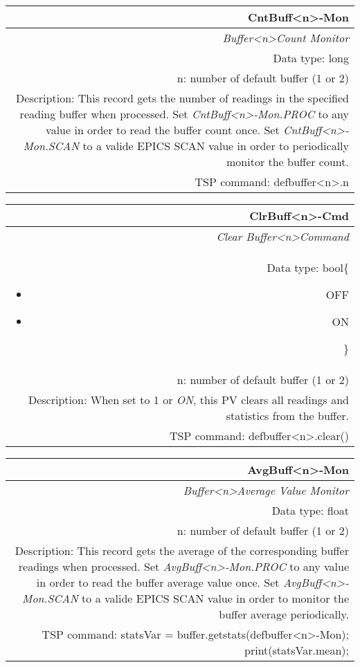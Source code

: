 \documentclass[openany]{article}
\begin{document}
		\begin{tabular}{N}
			\hline
			\bfseries CntBuff\textless n\textgreater-Mon\label{pv:cntbuff-mon} \\ \hline
			\emph{Buffer\textless n\textgreater Count Monitor} \\
			Data type: long \\
			n: number of default buffer (1 or 2) \\
			Description: This record gets the number of readings in the specified reading buffer when processed. Set \emph{CntBuff\textless n\textgreater-Mon.PROC} to any value in order to read the buffer count once. Set \emph{CntBuff\textless n\textgreater-Mon.SCAN} to a valide EPICS SCAN value in order to periodically monitor the buffer count. \\
			TSP command: defbuffer\textless n\textgreater.n
		\end{tabular}

		\begin{tabular}{N}
			\hline
			\bfseries ClrBuff\textless n\textgreater-Cmd\label{pv:clrbuff-cmd} \\ \hline
			\emph{Clear Buffer\textless n\textgreater Command} \\
			Data type: bool\{\begin{itemize}[noitemsep]
				\small
				\item[] OFF
				\item[] ON
			\end{itemize}\} \\
			n: number of default buffer (1 or 2) \\
			Description: When set to 1 or \emph{ON}, this PV clears all readings and statistics from the buffer. \\
			TSP command: defbuffer\textless n\textgreater.clear()
		\end{tabular}

		\begin{tabular}{N}
			\hline
			\bfseries AvgBuff\textless n\textgreater-Mon\label{pv:avgbuff-mon} \\ \hline
			\emph{Buffer\textless n\textgreater Average Value Monitor} \\
			Data type: float \\
			n: number of default buffer (1 or 2) \\
			Description: This record gets the average of the corresponding buffer readings when processed. Set \emph{AvgBuff\textless n\textgreater-Mon.PROC} to any value in order to read the buffer average value once. Set \emph{AvgBuff\textless n\textgreater-Mon.SCAN} to a valide EPICS SCAN value in order to monitor the buffer average periodically. \\
			TSP command: statsVar = buffer.getstats(defbuffer\textless n\textgreater-Mon); print(statsVar.mean);
		\end{tabular}
\end{document}
